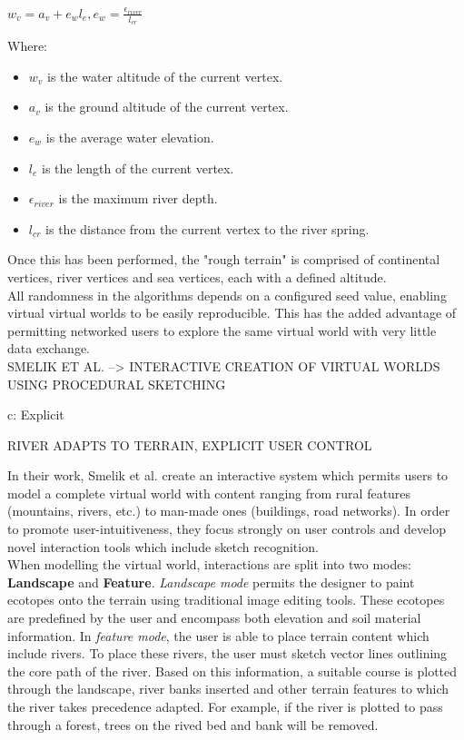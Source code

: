 $w_{v} = a_{v} + e_{w}l_{e}, e_{w} = \frac{\epsilon_{river}}{l_{cr}} $

Where:
\begin{itemize}
\item $w_{v}$ is the water altitude of the current vertex.
\item $a_{v}$ is the ground altitude of the current vertex.
\item $e_{w}$ is the average water elevation.
\item $l_{e}$ is the length of the current vertex.
\item $\epsilon_{river}$ is the maximum river depth.
\item $l_{cr}$ is the distance from the current vertex to the river spring.
\end{itemize}

Once this has been performed, the "rough terrain" is comprised of continental vertices, river vertices and sea vertices, each with a defined altitude.\\

All randomness in the algorithms depends on a configured seed value, enabling virtual virtual worlds to be easily reproducible. This has the added advantage of permitting networked users to explore the same virtual world with very little data exchange. \\


SMELIK ET AL. --> INTERACTIVE CREATION OF VIRTUAL WORLDS USING PROCEDURAL SKETCHING

c: Explicit

RIVER ADAPTS TO TERRAIN, EXPLICIT USER CONTROL

In their work, Smelik et al. create an interactive system which permits users to model a complete virtual world with content ranging from rural features (mountains, rivers, etc.) to man-made ones (buildings, road networks). In order to promote user-intuitiveness, they focus strongly on user controls and develop novel interaction tools which include sketch recognition.\\
When modelling the virtual world, interactions are split into two modes: \textbf{Landscape} and \textbf{Feature}. \textit{Landscape mode} permits the designer to paint ecotopes onto the terrain using traditional image editing tools. These ecotopes are predefined by the user and encompass both elevation and soil material information. In \textit{feature mode}, the user is able to place terrain content which include rivers. To place these rivers, the user must sketch vector lines outlining the core path of the river. Based on this information, a suitable course is plotted through the landscape, river banks inserted and other terrain features to which the river takes precedence adapted. For example, if the river is plotted to pass through a forest, trees on the rived bed and bank will be removed. 


